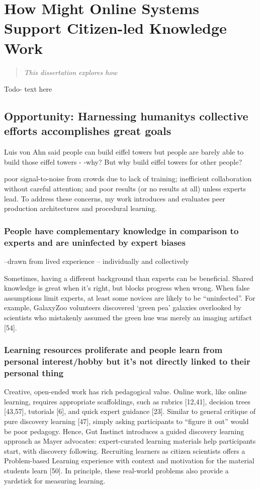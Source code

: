 \chapter{How Might Online Systems Support Citizen-led Knowledge Work}

\begin{quote}
\emph{This dissertation explores how }
\end{quote}
\vspace{0.25in}

Todo- text here

\section{Opportunity: Harnessing humanity\textquotesingle s collective efforts accomplishes great goals}
Luis von Ahn said people can build eiffel towers but people are barely able to build those eiffel towers - -why? But why build eiffel towers for other people?

poor signal-to-noise from crowds due to lack of training; inefficient collaboration without careful attention; and poor results (or no results at all) unless experts lead. To address these concerns, my work introduces and evaluates peer production architectures and procedural learning.

\subsection{People have complementary knowledge in comparison to experts and are uninfected by expert biases}
--drawn from lived experience
-- individually and collectively

Sometimes, having a different background than experts can
be beneficial. Shared knowledge is great when it’s right, but
blocks progress when wrong. When false assumptions limit
experts, at least some novices are likely to be “uninfected”.
For example, GalaxyZoo volunteers discovered ‘green pea’
galaxies overlooked by scientists who mistakenly assumed
the green hue was merely an imaging artifact [54]. 

\subsection{Learning resources proliferate and people learn from personal interest/hobby but it's not directly linked to their personal thing}
Creative, open-ended work has rich pedagogical value.
Online work, like online learning, requires appropriate
scaffoldings, such as rubrics [12,41], decision trees [43,57],
tutorials [6], and quick expert guidance [23]. Similar to
general critique of pure discovery learning [47], simply
asking participants to “figure it out” would be poor pedagogy. Hence, Gut Instinct introduces a guided discovery
learning approach as Mayer advocates: expert-curated
learning materials help participants start, with discovery
following. Recruiting learners as citizen scientists offers a
Problem-based Learning experience with context and motivation for the material students learn [50]. In principle,
these real-world problems also provide a yardstick for
measuring learning. 

